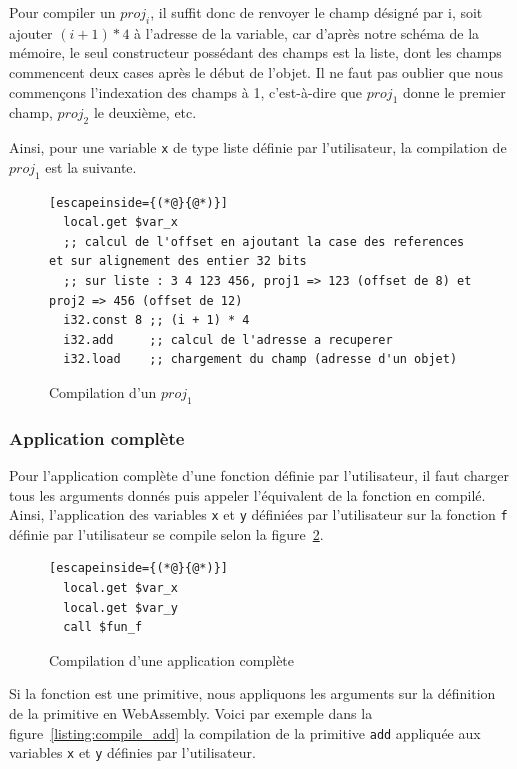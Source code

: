 \documentclass{rapportECL}
\begin{document}
Pour compiler un $proj_i$, il suffit donc de renvoyer le champ désigné par i, soit ajouter $(i + 1)*4$ à l'adresse de la variable, car
d'après notre schéma de la mémoire, le seul constructeur possédant des champs est la liste, dont les champs commencent deux cases 
après le début de l'objet.
Il ne faut pas oublier que nous commençons l'indexation des champs à 1, c'est-à-dire que $proj_1$ donne le premier champ, 
$proj_2$ le deuxième, etc.

Ainsi, pour une variable \verb|x| de type liste définie par l'utilisateur, la compilation de $proj_1$ est la suivante.
\begin{figure}[H]
	\begin{lstlisting}[escapeinside={(*@}{@*)}]
  local.get $var_x
  ;; calcul de l'offset en ajoutant la case des references et sur alignement des entier 32 bits
  ;; sur liste : 3 4 123 456, proj1 => 123 (offset de 8) et proj2 => 456 (offset de 12)
  i32.const 8 ;; (i + 1) * 4
  i32.add     ;; calcul de l'adresse a recuperer
  i32.load    ;; chargement du champ (adresse d'un objet)
\end{lstlisting}
\caption{Compilation d'un $proj_1$}
\label{listing:compile_proj}
\end{figure}

\subsubsection{Application complète}

Pour l'application complète d'une fonction définie par l'utilisateur, il faut charger tous les arguments donnés puis appeler 
l'équivalent de la fonction en compilé. Ainsi, l'application des variables \verb|x| et \verb|y| définiées par l'utilisateur sur 
la fonction \verb|f| définie par l'utilisateur se compile selon la figure~\ref{listing:compile_app_comp_const}.

\begin{figure}[H]
	\begin{lstlisting}[escapeinside={(*@}{@*)}]
  local.get $var_x
  local.get $var_y
  call $fun_f
	\end{lstlisting}
	\caption{Compilation d'une application complète}
	\label{listing:compile_app_comp_const}
\end{figure}

Si la fonction est une primitive, nous appliquons les arguments sur la définition de la primitive en WebAssembly.
Voici par exemple dans la figure~\ref{listing:compile_add} la compilation de la primitive \verb|add| appliquée aux variables 
\verb|x| et \verb|y| définies par l'utilisateur.
\end{document}
